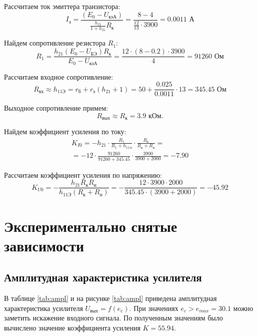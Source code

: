 Рассчитаем ток эмиттера транзистора: 
\[
I_\text{э} = \frac{(E_0 - U_\text{кэА})}{\frac{h_{21}}{1+h_{21}}R_\text{к}} = \frac{8 - 4}{\frac{12}{13} \cdot 3900} = 0.0011 \text{ А}
\]

Найдем сопротивление резистора $R_1$:
\[
R_1 = \frac{h_{21}(E_0-U_\text{БЭ})R_\text{к}}{E_0-U_\text{кэА}} = \frac{12 \cdot (8 - 0.2) \cdot 3900}{4} = 91260 \text{ Ом}
\]

Рассчитаем входное сопротивление:
\begin{equation}\label{eq:r_in}
R_\text{вх} \approx h_\text{11Э} = r_\text{б} + r_\text{э}(h_{21} + 1) = 50 + \frac{0.025}{0.0011} \cdot 13 = 345.45 \text{ Ом}
\end{equation}

Выходное сопротивление примем:
\begin{equation}
R_\text{вых} \approx R_\text{к} = 3.9 \text{ кОм}.
\end{equation}

Найдем коэффициент усиления по току:
\begin{multline}
K_{I0} = -h_{21} \cdot \frac{R_1}{R_1 + h_\text{11Э}} \cdot \frac{R_\text{к}}{R_\text{к} + R_\text{н}} =\\= - 12 \cdot \frac{91260}{91260 + 345.45} \cdot \frac{3900}{3900 + 2000} = - 7.90
\end{multline}

Рассчитаем коэффициент усиления по напряжению:
\begin{equation}\label{eq:k_u0}
K_{U0} = -\frac{h_{21} R_\text{к} R_\text{н}}{h_\text{11Э}(R_\text{к} + R_\text{н})} = -\frac{12 \cdot 3900 \cdot 2000}{345.45 \cdot (3900 + 2000)} = -45.92
\end{equation}

\newpage

\section{Экспериментально снятые зависимости}

\subsection{Амплитудная характеристика усилителя}

В таблице \ref{tab:ampl} и на рисунке \ref{tab:ampl} приведена амплитудная характеристика усилителя $U_\text{вых} = f(e_c)$. При значениях $e_c > e_{max} = 30.1$ можно заметить искажение входного сигнала. По полученным значениям было вычислено значение коэффициента усиления $K = 55.94$.

